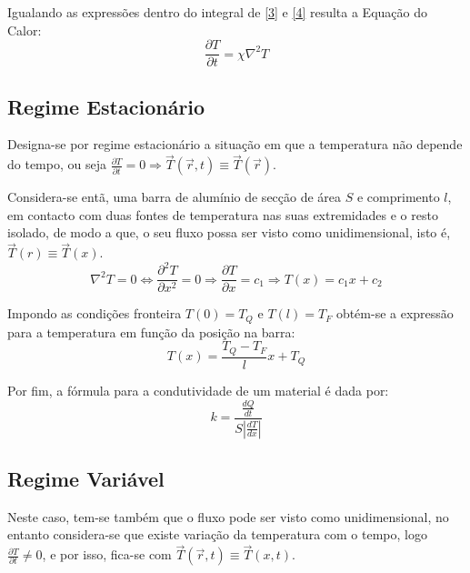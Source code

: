 \documentclass[8pt]{extarticle}
\begin{document}
\begin{multicols}{2}
Igualando as expressões dentro do integral de \ref{3} e \ref{4} resulta a Equação do Calor:
\begin{equation}
\frac{\partial T}{\partial t} = \chi \nabla^2 T 
\end{equation}
\begin{center}
\par{}
\end{center}

\subsection*{Regime Estacionário}
\par Designa-se por regime estacionário a situação em que a temperatura não depende do tempo, ou seja $\frac{\partial T}{\partial t} = 0 \Rightarrow \vec{T}(\vec{r},t) \equiv \vec{T}(\vec{r})$.
\par Considera-se entã, uma barra de alumínio de secção de área $S$ e comprimento $l$, em contacto com duas fontes de temperatura nas suas extremidades e o resto isolado, de modo a que, o seu fluxo possa ser visto como unidimensional, isto é, $\vec{T}(r) \equiv \vec{T}(x)$.
\begin{equation} \label{ajuste1}
\nabla^2 T = 0 \Leftrightarrow \frac{\partial ^2 T}{\partial x^2} = 0 \Rightarrow \frac{\partial T}{\partial x} = c_1 \Rightarrow T(x) = c_1 x + c_2
\end{equation}

\par Impondo as condições fronteira $T(0) = T_{Q}$ e $T(l) = T_{F}$ obtém-se a expressão para a temperatura em função da posição na barra: 
\begin{equation}
T(x) = \frac{T_ {Q} - T_{F}}{l}x + T_{Q}
\end{equation}

\par Por fim, a fórmula para a condutividade de um material é dada por:
\begin{equation} \label{k}
k = \frac{\frac{dQ}{dt}}{S|\frac{dT}{dx}|}
\end{equation}
\begin{center}
\par{}
\end{center}

\subsection*{Regime Variável}
Neste caso, tem-se também que o fluxo pode ser visto como unidimensional, no entanto considera-se que existe variação da temperatura com o tempo, logo $\frac{\partial T}{\partial t} \neq 0$, e por isso, fica-se com  $\vec{T}(\vec{r},t) \equiv \vec{T}(x,t)$.


\end{multicols}
\end{document}
